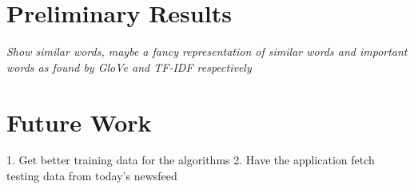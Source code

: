 \documentclass{article}
\begin{document}
\section{Preliminary Results} %
\textit{Show similar words, maybe a fancy representation of similar words and important words as found by GloVe and TF-IDF respectively}

\maketitle
\section {Future Work}
1. Get better training data for the algorithms
2. Have the application fetch testing data from today's newsfeed
\end{document}
